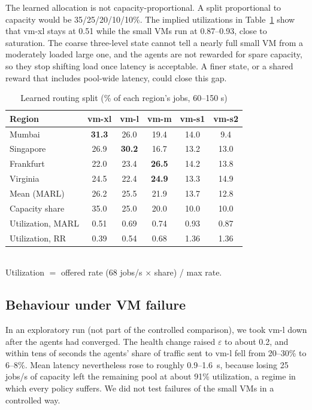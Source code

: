 \documentclass[conference]{IEEEtran}
\begin{document}
The learned allocation is not capacity-proportional. A split proportional to capacity would be 35/25/20/10/10\%. The implied utilizations in Table~\ref{tab:share} show that vm-xl stays at 0.51 while the small VMs run at 0.87--0.93, close to saturation. The coarse three-level state cannot tell a nearly full small VM from a moderately loaded large one, and the agents are not rewarded for spare capacity, so they stop shifting load once latency is acceptable. A finer state, or a shared reward that includes pool-wide latency, could close this gap.

\begin{table}[t]
\caption{Learned routing split (\% of each region's jobs, 60--150 s)}
\label{tab:share}
\centering
\begin{tabular}{@{}lccccc@{}}
\toprule
Region & vm-xl & vm-l & vm-m & vm-s1 & vm-s2 \\
\midrule
Mumbai    & \textbf{31.3} & 26.0 & 19.4 & 14.0 & 9.4 \\
Singapore & 26.9 & \textbf{30.2} & 16.7 & 13.2 & 13.0 \\
Frankfurt & 22.0 & 23.4 & \textbf{26.5} & 14.2 & 13.8 \\
Virginia  & 24.5 & 22.4 & \textbf{24.9} & 13.3 & 14.9 \\
\midrule
Mean (MARL)           & 26.2 & 25.5 & 21.9 & 13.7 & 12.8 \\
Capacity share        & 35.0 & 25.0 & 20.0 & 10.0 & 10.0 \\
\midrule
Utilization, MARL     & 0.51 & 0.69 & 0.74 & 0.93 & 0.87 \\
Utilization, RR       & 0.39 & 0.54 & 0.68 & 1.36 & 1.36 \\
\bottomrule
\end{tabular}
\\[2pt]{\footnotesize Utilization $=$ offered rate (68 jobs/s $\times$ share) / max rate.}
\end{table}

\subsection{Behaviour under VM failure}
In an exploratory run (not part of the controlled comparison), we took vm-l down after the agents had converged. The health change raised $\varepsilon$ to about 0.2, and within tens of seconds the agents' share of traffic sent to vm-l fell from 20--30\% to 6--8\%. Mean latency nevertheless rose to roughly 0.9--1.6~s, because losing 25 jobs/s of capacity left the remaining pool at about 91\% utilization, a regime in which every policy suffers. We did not test failures of the small VMs in a controlled way.
\end{document}
